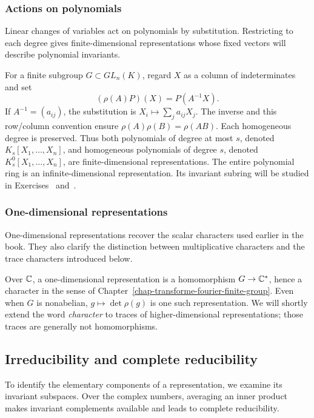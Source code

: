 \subsubsection{Actions on polynomials}
\label{sect3-action-polynomials}

Linear changes of variables act on polynomials by substitution. Restricting
to each degree gives finite-dimensional representations whose fixed vectors
will describe polynomial invariants.

For a finite subgroup $G\subset GL_n(K)$, regard $X$ as a column of
indeterminates and set
\[
 (\rho(A)P)(X)=P(A^{-1}X).
\]
If $A^{-1}=(a_{ij})$, the substitution is
$X_i\mapsto\sum_j a_{ij}X_j$. The inverse and this row/column convention
ensure $\rho(A)\rho(B)=\rho(AB)$. Each homogeneous degree is preserved.
Thus both polynomials of degree at most $s$, denoted $K_s[X_1,\ldots,X_n]$,
and homogeneous polynomials of degree $s$, denoted $K_s^0[X_1,\ldots,X_n]$,
are finite-dimensional representations. The entire polynomial ring is an
infinite-dimensional representation. Its invariant subring will be studied
in Exercises~ and~.

\subsubsection{One-dimensional representations}
\label{sect3-representation-degre-1}

One-dimensional representations recover the scalar characters used earlier
in the book. They also clarify the distinction between multiplicative
characters and the trace characters introduced below.

Over $\mathbb{C}$, a one-dimensional representation is a homomorphism
$G\to\mathbb{C}^*$, hence a character in the sense of
Chapter~\ref{chap-transforme-fourier-finite-group}. Even when $G$ is
nonabelian, $g\mapsto\det\rho(g)$ is one such representation. We will
shortly extend the word \emph{character} to traces of higher-dimensional
representations; those traces are generally not homomorphisms.

\subsection{Irreducibility and complete reducibility}
\label{sect2-representations-irreducibles}

To identify the elementary components of a representation, we examine its
invariant subspaces. Over the complex numbers, averaging an inner product
makes invariant complements available and leads to complete reducibility.

